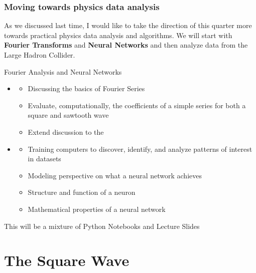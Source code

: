 \documentclass[hyperref={colorlinks=true}]{beamer}
\begin{document}
\begin{frame}%
  \frametitle{Moving towards physics data analysis}

  As we discussed last time, I would like to take the direction of this quarter more towards practical physics data analysis and algorithms. We will start with \textbf{Fourier Transforms} and \textbf{Neural Networks} and then analyze data from the Large Hadron Collider.
  
  \vspace{0.3cm}
  
  \begin{ucblock}{Fourier Analysis and Neural Networks}
    \begin{itemize}
      \item {} 
      \begin{itemize}
        \item Discussing the basics of Fourier Series 
        \item Evaluate, computationally, the coefficients of a simple series for both a square and sawtooth wave
        \item Extend discussion to the 
      \end{itemize}
      \item {} 
      \begin{itemize}
        \item Training computers to discover, identify, and analyze patterns of interest in datasets 
        \item Modeling perspective on what a neural network achieves
        \item Structure and function of a neuron
        \item Mathematical properties of a neural network
      \end{itemize}
    \end{itemize}
  \end{ucblock}
  
  \mysp
  
  This will be a mixture of Python Notebooks and Lecture Slides

\end{frame}


\section[The Square Wave]{The Square Wave}
\end{document}
